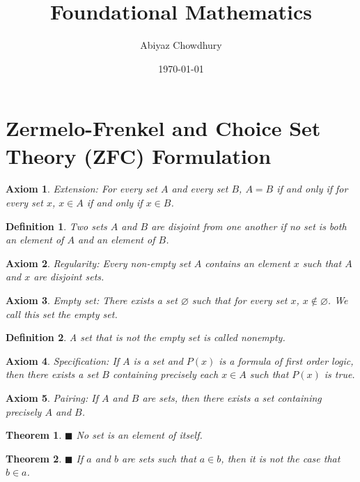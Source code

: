 \documentclass[a4paper]{article}
\title{\textbf{Foundational Mathematics}}
\author{Abiyaz Chowdhury}
\date{\today}
\newtheorem{mytheorem}{Theorem}
\newtheorem{axiom}{Axiom}
\newtheorem{mydef}{Definition}
\numberwithin{mytheorem}{section}
\numberwithin{mydef}{section}
\numberwithin{axiom}{section}
\numberwithin{example}{section}
\newcommand{\done}{$\blacksquare$ }
\begin{document}
\maketitle

\section{Zermelo-Frenkel and Choice Set Theory (ZFC) Formulation}

\begin{axiom} Extension: For every set $A$ and every set $B$, $A = B$ if and only if for every set $x$, $x \in A$ if and only if $x \in B$. 
\end{axiom}

\begin{mydef} Two sets $A$ and $B$ are disjoint from one another if no set is both an element of $A$ and an element of $B$. 
\end{mydef}

\begin{axiom} Regularity: Every non-empty set $A$ contains an element $x$ such that $A$ and $x$ are disjoint sets.
\end{axiom}

\begin{axiom} Empty set: There exists a set $\varnothing$ such that for every set $x$, $x \notin \varnothing$. We call this set the empty set.
\end{axiom}

\begin{mydef} A set that is not the empty set is called nonempty.
\end{mydef}

\begin{axiom} Specification: If $A$ is a set and $P(x)$ is a formula of first order logic, then there exists a set $B$ containing precisely each $x \in A$ such that $P(x)$ is true. 
\end{axiom}

\begin{axiom} Pairing: If $A$ and $B$ are sets, then there exists a set containing precisely $A$ and $B$.
\end{axiom}

\begin{mytheorem} \done  No set is an element of itself. \end{mytheorem}

\begin{mytheorem} \done If $a$ and $b$ are sets such that $a \in b$, then it is not the case that $b \in a$. \end{mytheorem}
\end{document}
